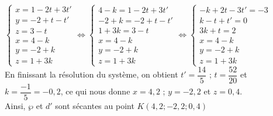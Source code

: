 \documentclass{cornouaille}
\begin{document}
\begin{methode}
$\begin{cases} x=1-2t+3t'\\y=-2+t-t'\\z=3-t\\x=4-k\\y=-2+k\\z=1+3k \end{cases}\Leftrightarrow \begin{cases} 4-k=1-2t+3t'\\-2+k=-2+t-t'\\1+3k=3-t\\x=4-k\\y=-2+k\\z=1+3k \end{cases}\Leftrightarrow \begin{cases} -k+2t-3t'=-3\\k-t+t'=0\\3k+t=2\\x=4-k\\y=-2+k\\z=1+3k\end{cases}$\\
En finissant la résolution du système, on obtient 
 $t'=\dfrac{14}{5}$ ; $t=\dfrac{52}{20}$ et $k=\dfrac{-1}{5}=-0,2$, ce qui nous donne $x=4,2$ ; $y=-2,2$ et $z=0,4$.\\ 
Ainsi, $\wp$ et $d'$ sont sécantes au point $K(4,2;-2,2;0,4)$







\end{methode}
\end{document}
